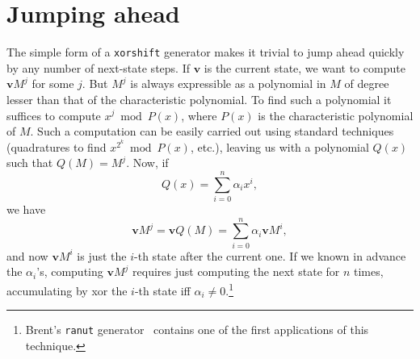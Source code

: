 \documentclass{acmsmalltr}
\newcommand{\xorshift}[1][]{\texttt{xorshift#1}\xspace}
\newcommand{\xst}[3]{#1, #2, #3}
\begin{document}

\section{Jumping ahead}

The simple form of a \xorshift generator makes it trivial to jump ahead quickly
by any number of next-state steps. If $\bm v$ is the current state, we want to
compute $\bm v M^j$ for some $j$. But $M^j$ is always expressible as a
polynomial in $M$ of degree lesser than that of the characteristic polynomial.
To find such a polynomial it suffices to compute $x^j \bmod P(x)$, where $P(x)$
is the characteristic polynomial of $M$. Such a computation can be easily
carried out using standard techniques (quadratures to find $x^{2^k}\bmod P(x)$,
etc.), leaving us with a polynomial $Q(x)$ such that $Q(M)=M^j$. Now, if \[
Q(x)=\sum_{i=0}^n \alpha_ix^i, \] we have \[ \bm v M^j = \bm v Q(M)
=\sum_{i=0}^n \alpha_i\bm vM^i, \] and now $\bm v M^i$ is just the $i$-th state
after the current one. If we known in advance the $\alpha_i$'s, computing $\bm
vM^j$ requires just computing the next state for $n$ times, accumulating by xor
the $i$-th state iff $\alpha_i\neq0$.\footnote{Brent's
\texttt{ranut} generator~\cite{BreURNGS} contains one of the first
applications of this technique.}
\end{document}
